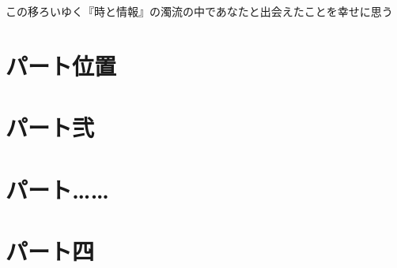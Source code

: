 \documentclass{../ybmain}
\begin{document}
    \begin{titlepage}
        
    \end{titlepage}

    \setcounter{tocdepth}{0}
    \tableofcontents
    \thispagestyle{empty}

\clearpage

    \thispagestyle{empty}
    \null\vfill
    \begin{center}
        この移ろいゆく『時と情報』の濁流の中であなたと出会えたことを幸せに思う
    \end{center}
    \vfill\null


    \part{パート位置}
    \part{パート弐}
    \part{パート……}
    \part{パート四}
\end{document}
